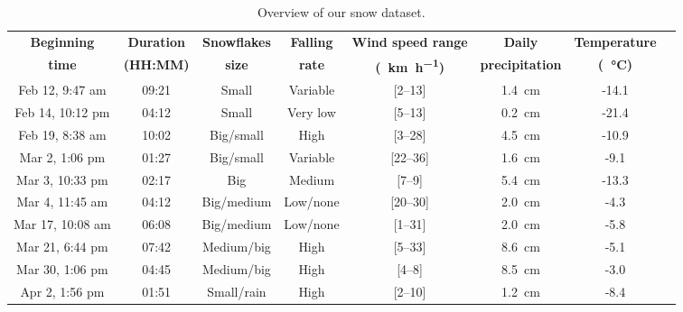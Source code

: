 \begin{table}[htbp]
    \centering
    \begin{tabular}{|c|c|c|c|c|c|c|c|}
        \hline
        \textbf{Beginning} & \textbf{Duration} & \textbf{Snowflakes} & \textbf{Falling} & \textbf{Wind speed range}      & \textbf{Daily}         & \textbf{Temperature}       \\
        \textbf{time}      & \textbf{(HH:MM)}  & \textbf{size}       & \textbf{rate}    & \textbf{(\SI{}{\km\per\hour})} & \textbf{precipitation} & \textbf{(\SI{}{\celsius})} \\\hline
        Feb 12, 9:47 am    &  09:21            & Small               & Variable         & [2--13]                         & \SI{1.4}{\cm}         & -14.1                      \\\hline
        Feb 14, 10:12 pm   &  04:12            & Small               & Very low         & [5--13]                         & \SI{0.2}{\cm}         & -21.4                      \\\hline
        Feb 19, 8:38 am    &  10:02            & Big/small           & High             & [3--28]                         & \SI{4.5}{\cm}         & -10.9                      \\\hline
        Mar 2, 1:06 pm     &  01:27            & Big/small           & Variable         & [22--36]                        & \SI{1.6}{\cm}         & -9.1                       \\\hline
        Mar 3, 10:33 pm    &  02:17            & Big                 & Medium           & [7--9]                          & \SI{5.4}{\cm}         & -13.3                      \\\hline
        Mar 4, 11:45 am    &  04:12            & Big/medium          & Low/none         & [20--30]                        & \SI{2.0}{\cm}         & -4.3                       \\\hline
        Mar 17, 10:08 am   &  06:08            & Big/medium          & Low/none         & [1--31]                         & \SI{2.0}{\cm}         & -5.8                       \\\hline
        Mar 21, 6:44 pm    &  07:42            & Medium/big          & High             & [5--33]                         & \SI{8.6}{\cm}         & -5.1                       \\\hline
        Mar 30, 1:06 pm    &  04:45            & Medium/big          & High             & [4--8]                          & \SI{8.5}{\cm}         & -3.0                       \\\hline
        Apr 2, 1:56 pm     &  01:51            & Small/rain          & High             & [2--10]                         & \SI{1.2}{\cm}         & -8.4                       \\\hline
    \end{tabular}
    \caption{Overview of our snow dataset.}
    \label{tab:overview-dataset}
\end{table}


